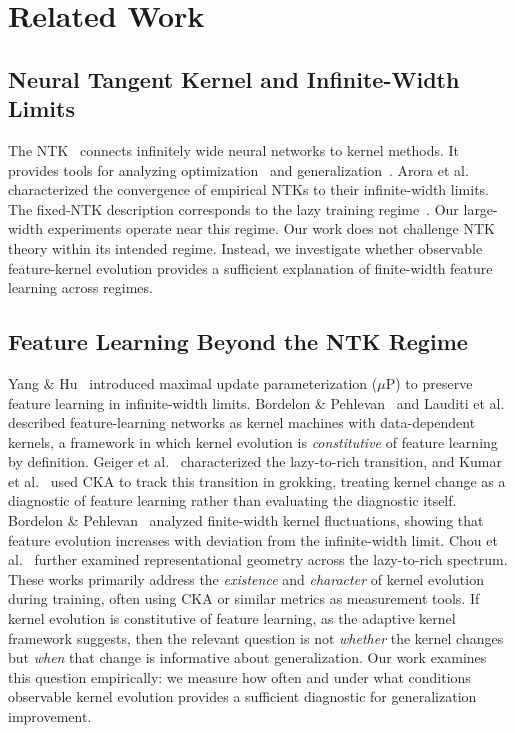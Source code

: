 \documentclass[twoside,11pt]{article}
\begin{document}
\section{Related Work}
\label{sec:related}

\subsection{Neural Tangent Kernel and Infinite-Width Limits}
The NTK~\citep{jacot2018neural} connects infinitely wide neural networks to kernel methods. It provides tools for analyzing optimization~\citep{du2019neural,allen2019learning} and generalization~\citep{arora2019exact}.  Arora et al.~\cite{arora2019exact} characterized the convergence of empirical NTKs to their infinite-width limits.  The fixed-NTK description corresponds to the lazy training regime~\citep{chizat2020lazy}.  Our large-width experiments operate near this regime.  Our work does not challenge NTK theory within its intended regime. Instead, we investigate whether observable feature-kernel evolution provides a sufficient explanation of finite-width feature learning across regimes.

\subsection{Feature Learning Beyond the NTK Regime}
Yang \& Hu~\cite{yang2021tensor} introduced maximal update parameterization ($\mu$P) to preserve feature learning in infinite-width limits.  Bordelon \& Pehlevan~\cite{bordelon2020spectral} and Lauditi et al.~\cite{lauditi2025adaptive} described feature-learning networks as kernel machines with data-dependent kernels, a framework in which kernel evolution is \emph{constitutive} of feature learning by definition.  Geiger et al.~\cite{geiger2020scaling} characterized the lazy-to-rich transition, and Kumar et al.~\cite{kumar2024grokking} used CKA to track this transition in grokking, treating kernel change as a diagnostic of feature learning rather than evaluating the diagnostic itself.  Bordelon \& Pehlevan~\cite{bordelon2023dynamics} analyzed finite-width kernel fluctuations, showing that feature evolution increases with deviation from the infinite-width limit.  Chou et al.~\cite{chou2025feature,chou2026twospeeds} further examined representational geometry across the lazy-to-rich spectrum.  These works primarily address the \emph{existence} and \emph{character} of kernel evolution during training, often using CKA or similar metrics as measurement tools.  If kernel evolution is constitutive of feature learning, as the adaptive kernel framework suggests, then the relevant question is not \emph{whether} the kernel changes but \emph{when} that change is informative about generalization.  Our work examines this question empirically: we measure how often and under what conditions observable kernel evolution provides a sufficient diagnostic for generalization improvement.
\end{document}
